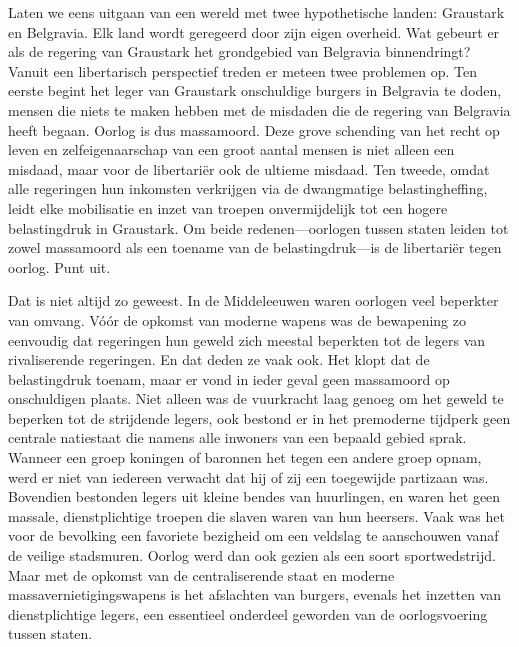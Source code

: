 \documentclass[
  a5paper,
  smalldemyvopaper,10pt,twoside,onecolumn,openright,extrafontsizes,hidelinks]{memoir}
\begin{document}
Laten we eens uitgaan van een wereld met twee hypothetische landen:
Graustark en Belgravia. Elk land wordt geregeerd door zijn eigen
overheid. Wat gebeurt er als de regering van Graustark het grondgebied
van Belgravia binnendringt? Vanuit een libertarisch perspectief treden
er meteen twee problemen op. Ten eerste begint het leger van Graustark
onschuldige burgers in Belgravia te doden, mensen die niets te maken
hebben met de misdaden die de regering van Belgravia heeft begaan.
Oorlog is dus massamoord. Deze grove schending van het recht op leven en
zelfeigenaarschap van een groot aantal mensen is niet alleen een
misdaad, maar voor de libertariër ook de ultieme misdaad. Ten tweede,
omdat alle regeringen hun inkomsten verkrijgen via de dwangmatige
belastingheffing, leidt elke mobilisatie en inzet van troepen
onvermijdelijk tot een hogere belastingdruk in Graustark. Om beide
redenen---oorlogen tussen staten leiden tot zowel massamoord als een
toename van de belastingdruk---is de libertariër tegen oorlog. Punt uit.

Dat is niet altijd zo geweest. In de Middeleeuwen waren oorlogen veel
beperkter van omvang. Vóór de opkomst van moderne wapens was de
bewapening zo eenvoudig dat regeringen hun geweld zich meestal beperkten
tot de legers van rivaliserende regeringen. En dat deden ze vaak ook.
Het klopt dat de belastingdruk toenam, maar er vond in ieder geval geen
massamoord op onschuldigen plaats. Niet alleen was de vuurkracht laag
genoeg om het geweld te beperken tot de strijdende legers, ook bestond
er in het premoderne tijdperk geen centrale natiestaat die namens alle
inwoners van een bepaald gebied sprak. Wanneer een groep koningen of
baronnen het tegen een andere groep opnam, werd er niet van iedereen
verwacht dat hij of zij een toegewijde partizaan was. Bovendien
bestonden legers uit kleine bendes van huurlingen, en waren het geen
massale, dienstplichtige troepen die slaven waren van hun heersers. Vaak
was het voor de bevolking een favoriete bezigheid om een veldslag te
aanschouwen vanaf de veilige stadsmuren. Oorlog werd dan ook gezien als
een soort sportwedstrijd. Maar met de opkomst van de centraliserende
staat en moderne massavernietigingswapens is het afslachten van burgers,
evenals het inzetten van dienstplichtige legers, een essentieel
onderdeel geworden van de oorlogsvoering tussen staten.
\end{document}
